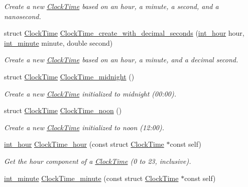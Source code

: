 \begin{DoxyCompactItemize}
\begin{DoxyCompactList}\small\item\em \-Create a new \hyperlink{structClockTime}{\-Clock\-Time} based on an hour, a minute, a second, and a nanosecond. \end{DoxyCompactList}\item 
struct \hyperlink{structClockTime}{\-Clock\-Time} \hyperlink{clock-time_8h_a519b7c6074cf1addc815f7495048c30b}{\-Clock\-Time\-\_\-create\-\_\-with\-\_\-decimal\-\_\-seconds} (\hyperlink{types_8h_a62ed583cd6a13da9650111e3b4b4eedc}{int\-\_\-hour} hour, \hyperlink{types_8h_a3e55debfc84cabacf28bddf2d04984c9}{int\-\_\-minute} minute, double second)
\begin{DoxyCompactList}\small\item\em \-Create a new \hyperlink{structClockTime}{\-Clock\-Time} based on an hour, a minute, and a decimal second. \end{DoxyCompactList}\item 
struct \hyperlink{structClockTime}{\-Clock\-Time} \hyperlink{clock-time_8h_ae320c2e30dedf0b33d5306b9e8841261}{\-Clock\-Time\-\_\-midnight} ()
\begin{DoxyCompactList}\small\item\em \-Create a new \hyperlink{structClockTime}{\-Clock\-Time} initialized to midnight (00\-:00). \end{DoxyCompactList}\item 
struct \hyperlink{structClockTime}{\-Clock\-Time} \hyperlink{clock-time_8h_a183049a7386a7b7377ba3059d15485c4}{\-Clock\-Time\-\_\-noon} ()
\begin{DoxyCompactList}\small\item\em \-Create a new \hyperlink{structClockTime}{\-Clock\-Time} initialized to noon (12\-:00). \end{DoxyCompactList}\item 
\hyperlink{types_8h_a62ed583cd6a13da9650111e3b4b4eedc}{int\-\_\-hour} \hyperlink{clock-time_8h_a197ecd5df7f193d534e51794051ea68c}{\-Clock\-Time\-\_\-hour} (const struct \hyperlink{structClockTime}{\-Clock\-Time} $\ast$const self)
\begin{DoxyCompactList}\small\item\em \-Get the hour component of a \hyperlink{structClockTime}{\-Clock\-Time} (0 to 23, inclusive). \end{DoxyCompactList}\item 
\hyperlink{types_8h_a3e55debfc84cabacf28bddf2d04984c9}{int\-\_\-minute} \hyperlink{clock-time_8h_a71ebda6c0d3f39c5ee3287170b081e62}{\-Clock\-Time\-\_\-minute} (const struct \hyperlink{structClockTime}{\-Clock\-Time} $\ast$const self)

\end{DoxyCompactItemize}
